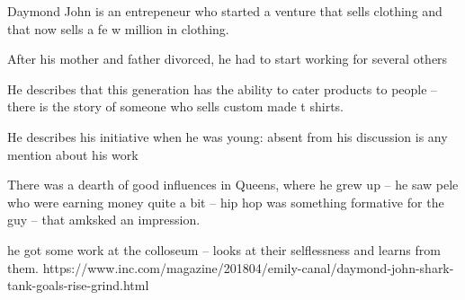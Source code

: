 Daymond John is an entrepeneur who started a venture that sells clothing and that now sells a fe w million in clothing.

After his mother and father divorced, he had to start working for several others

He describes that this generation has the ability to cater products to people -- there
is the story of someone who sells custom made t shirts. 

He describes his initiative when he was young: absent from his discussion is any mention about his work


There was a dearth of good influences in Queens, where he grew up -- he saw pele who were earning money quite a bit -- hip hop was something formative for the guy -- that amksked an impression.

he got some work at the colloseum -- looks at their selflessness and learns from them.
https://www.inc.com/magazine/201804/emily-canal/daymond-john-shark-tank-goals-rise-grind.html
